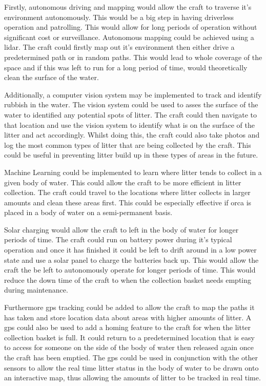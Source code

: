 \documentclass [12pt]{article}
\begin{document}
Firstly, autonomous driving and mapping would allow the craft to traverse it's environment autonomously. This would be a big step in having driverless operation and patrolling. This would allow for long periods of operation without significant cost or surveillance. Autonomous mapping could be achieved using a \gls{lidar}. The craft could firstly map out it's environment then either drive a predetermined path or in random paths. This would lead to whole coverage of the space and if this was left to run for a long period of time, would theoretically clean the surface of the water. 

Additionally, a computer vision system may be implemented to track and identify rubbish in the water. The vision system could be used to asses the surface of the water to identified any potential spots of litter. The craft could then navigate to that location and use the vision system to identify what is on the surface of the litter and act accordingly. Whilst doing this, the craft could also take photos and log the most common types of litter that are being collected by the craft. This could be useful in preventing litter build up in these types of areas in the future.  

Machine Learning could be implemented to learn where litter tends to collect in a given body of water. This could allow the craft to be more efficient in litter collection. The craft could travel to the locations where litter collects in larger amounts and clean these areas first. This could be especially effective if \gls{orca} is placed in a body of water on a semi-permanent basis. 

Solar charging would allow the craft to left in the body of water for longer periods of time. The craft could run on battery power during it's typical operation and once it has finished it could be left to drift around in a low power state and use a solar panel to charge the batteries back up. This would allow the craft the be left to autonomously operate for longer periods of time. This would reduce the down time of the craft to when the collection basket needs empting during maintenance.

Furthermore \gls{gps} tracking could be added to allow the craft to map the paths it has taken and store location data about areas with higher amounts of litter. A \gls{gps} could also be used to add a homing feature to the craft for when the litter collection basket is full. It could return to a predetermined location that is easy to access for someone on the side of the body of water then released again once the craft has been emptied. The \gls{gps} could be used in conjunction with the other sensors to allow the real time litter status in the body of water to be drawn onto an interactive map, thus allowing the amounts of litter to be tracked in real time. 
\end{document}
